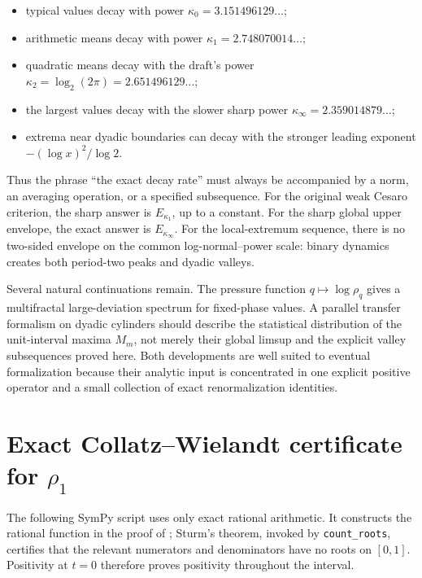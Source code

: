 \documentclass[11pt,oneside]{article}
\theoremstyle{definition}
\theoremstyle{remark}
\begin{document}
\begin{itemize}
\item typical values decay with power $\kappa_0=3.151496129\ldots$;
\item arithmetic means decay with power $\kappa_1=2.748070014\ldots$;
\item quadratic means decay with the draft's power
      $\kappa_2=\log_2(2\pi)=2.651496129\ldots$;
\item the largest values decay with the slower sharp power
      $\kappa_\infty=2.359014879\ldots$;
\item extrema near dyadic boundaries can decay with the stronger leading exponent
      $-(\log x)^2/\log2$.
\end{itemize}

Thus the phrase ``the exact decay rate'' must always be accompanied by a norm, an averaging
operation, or a specified subsequence.  For the original weak Cesaro criterion, the sharp
answer is $E_{\kappa_1}$, up to a constant.  For the sharp global upper envelope, the exact
answer is $E_{\kappa_\infty}$.  For the local-extremum sequence, there is no two-sided envelope on the common
log-normal--power scale: binary dynamics creates both period-two peaks and dyadic valleys.

Several natural continuations remain.  The pressure function $q\mapsto\log\rho_q$ gives a
multifractal large-deviation spectrum for fixed-phase values.  A parallel transfer formalism
on dyadic cylinders should describe the statistical distribution of the unit-interval
maxima $M_m$, not merely their global limsup and the explicit valley subsequences proved
here.  Both developments are well suited to eventual formalization because their analytic
input is concentrated in one explicit positive operator and a small collection of exact
renormalization identities.

\appendix

\section{Exact Collatz--Wielandt certificate for $\rho_1$}
\label{app:certificate}

The following SymPy script uses only exact rational arithmetic.  It constructs the rational
function in the proof of ; Sturm's theorem, invoked by
\texttt{count\_roots}, certifies that the relevant numerators and denominators have no roots
on $[0,1]$.  Positivity at $t=0$ therefore proves positivity throughout the interval.
\end{document}
